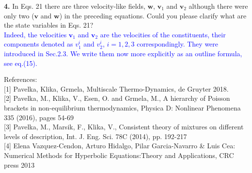 \documentclass[3p,times,table]{article}
\newcommand{\vv}{{\bm{v}}}
\newcommand{\ww}{{\bm{w}}}
\newcommand{\revThree}[1]{\textcolor{Blue}{#1}}
\begin{document}
\textbf{4.} In Eqs. 21 there are three velocity-like fields, $ \ww 
$, 
$ \vv_1 $ and $ \vv_2 $ although 
there were 
only two ($ \vv $ 
and $ \ww $) in the preceding equations. Could you please clarify 
what are 
the state variables in Eqs. 21?
\\
\revThree{Indeed, the velocities $ \vv_{1} $ and $ \vv_2 $ are the 
velocities of the constituents, their components denoted as $ v_1^i 
$ and $ v_2^i $, $ i=1,2,3 $ correspondingly. They were introduced 
in Sec.2.3. We write them now more explicitly as an outline formula, 
see 
eq.(15).}

References:
\\

[1] Pavelka, Klika, Grmela, Multiscale Thermo-Dynamics, de Gruyter 2018.\\

[2] Pavelka, M., Klika, V., Esen, O. and Grmela, M., A hierarchy of Poisson brackets in 
non-equilibrium thermodynamics, Physica D: Nonlinear Phenomena 335 (2016), pages 54-69 \\

[3] Pavelka, M., Marsik, F., Klika, V., Consistent theory of mixtures on different levels of 
description, Int. J. Eng. Sci. 78C (2014), pp. 192-217 \\

[4] Elena Vazquez-Cendon, Arturo Hidalgo, Pilar Garcia-Navarro \& Luis Cea: Numerical Methods for 
Hyperbolic Equations:Theory and Applications, CRC press 2013

%
%
\end{document}
